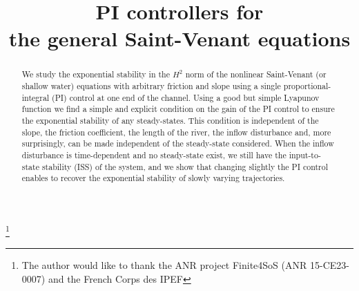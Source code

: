 \documentclass[JEP,XML,SOM,Unicode]{cedram}
\theoremstyle{definition}
\begin{document}
\frontmatter
\title[PI controllers for the general Saint-Venant equations]{PI controllers for\\ the general Saint-Venant equations}

\author[\initial{A.} \lastname{Hayat}]{ }
\address{Centre d’Enseignement et de Recherche en Mathématiques et Calcul Scientifique, École des Ponts ParisTech\\
6-8 avenue Blaise Pascal, Cité Descartes -- Champs-sur-Marne, 77455 Marne-la-Vallée, France}

\thanks{The author would like to thank the ANR project Finite4SoS (ANR 15-CE23-0007) and the French Corps des IPEF}

\begin{abstract}
We study the exponential stability in the $H^{2}$ norm of the nonlinear Saint-Venant (or shallow water) equations with arbitrary friction and slope using a single proportional-integral (PI) control at one end of the channel. {Using a good but simple Lyapunov function} we find a simple and explicit condition on the gain of the PI control to ensure the exponential stability of any steady-states. This condition is independent of the slope, the friction coefficient, the length of the river, the inflow disturbance and, more surprisingly, {can be made independent of} the steady-state considered. When the inflow disturbance is time-dependent and no steady-state exist, we still have the input-to-state stability {(ISS)} of the system, and we show that changing slightly the PI control enables to recover the exponential stability of slowly varying trajectories.
\end{abstract}




\end{document}
